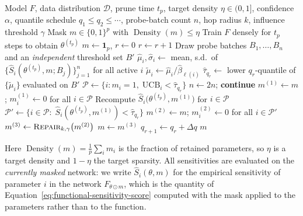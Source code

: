 \documentclass{article}
\theoremstyle{definition}
\theoremstyle{remark}
\begin{document}
\begin{algorithm}[!ht]
\caption{Functional-sensitivity pruning at prune time $t_p$}
\label{alg:sensitivity pruning}
\begin{algorithmic}[1]
\Require Model $F$, data distribution $\mathcal D$, prune time $t_p$, target density
$\eta\in(0,1]$, confidence $\alpha$, quantile schedule $q_1\le q_2\le\cdots$,
probe-batch count $n$, hop radius $k$, influence threshold $\gamma$
\Ensure Mask $m\in\{0,1\}^p$ with $\operatorname{Density}(m)\le\eta$
\State Train $F$ densely for $t_p$ steps to obtain $\theta^{(t_p)}$
\State $m\gets\mathbf 1_p$, \; $r\gets 0$
  \State $r\gets r+1$
  \State Draw probe batches $B_1,\ldots,B_n$ and an \emph{independent} threshold set $B'$
  \State $\hat\mu_i,\hat\sigma_i\gets$ mean, s.d.\ of
         $\bigl\{\widehat S_i(\theta^{(t_p)},m;B_j)\bigr\}_{j=1}^{n}$ for all active $i$
  \State $\widetilde\mu_i\gets\hat\mu_i/\widehat\beta_{\ell(i)}$
  \State $\hat\tau_{q_r}\gets$ lower $q_r$-quantile of $\{\widetilde\mu_i\}$ evaluated on $B'$
  \State $\mathcal P\gets\{i: m_i=1,\;\mathrm{UCB}_i<\hat\tau_{q_r}\}$
    \State $n\gets 2n$; \textbf{continue}
  \EndIf
  \State $m^{(1)}\gets m$; \; $m^{(1)}_i\gets 0$ for all $i\in\mathcal P$
  \State Recompute $\widehat S_i\bigl(\theta^{(t_p)},m^{(1)}\bigr)$ for $i\in\mathcal P$
  \State $\mathcal P'\gets\bigl\{i\in\mathcal P:\;
         \widehat S_i(\theta^{(t_p)},m^{(1)})<\hat\tau_{q_r}\bigr\}$
  \State $m^{(2)}\gets m$; \; $m^{(2)}_i\gets 0$ for all $i\in\mathcal P'$
  \State $m^{(3)}\gets\textsc{Repair}_{k,\gamma}\bigl(m^{(2)}\bigr)$
    \State $m\gets m^{(3)}$
  \Else
    \State $q_{r+1}\gets q_r+\Delta q$
  \EndIf
\EndWhile
\State \Return $m$
\end{algorithmic}
\end{algorithm}

Here $\operatorname{Density}(m)=\frac1p\sum_i m_i$ is the fraction of retained
parameters, so $\eta$ is a target density and $1-\eta$ the target sparsity. All
sensitivities are evaluated on the \emph{currently masked} network: we write
$\widehat S_i(\theta,m)$ for the empirical sensitivity of parameter $i$ in the
network $F_{\theta\odot m}$, which is the quantity of
Equation~\eqref{eq:functional-sensitivity-score} computed with the mask applied
to the parameters rather than to the function.
\end{document}

